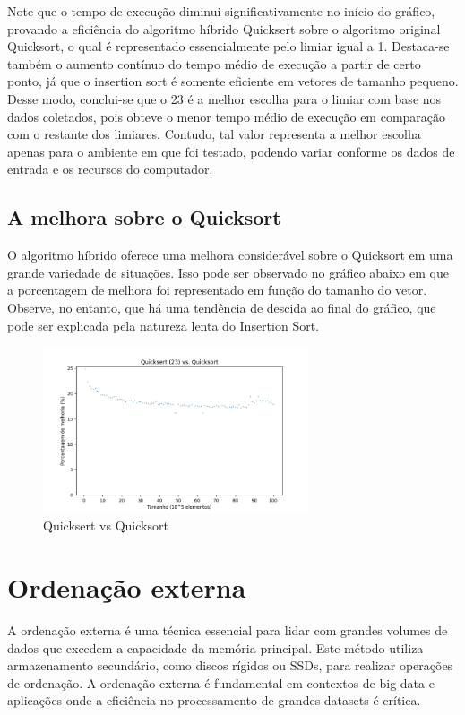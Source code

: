 \documentclass[12pt]{article}
\begin{document}
Note que o tempo de execução diminui significativamente no início do gráfico, provando a eficiência do algoritmo híbrido Quicksert sobre o algoritmo original Quicksort, o qual é representado essencialmente pelo limiar igual a 1. Destaca-se também o aumento contínuo do tempo médio de execução a partir de certo ponto, já que o insertion sort é somente eficiente em vetores de tamanho pequeno. Desse modo, conclui-se que o 23 é a melhor escolha para o limiar com base nos dados coletados, pois obteve o menor tempo médio de execução em comparação com o restante dos limiares. Contudo, tal valor representa a melhor escolha apenas para o ambiente em que foi testado, podendo variar conforme os dados de entrada e os recursos do computador.

\subsection{A melhora sobre o Quicksort}

O algoritmo híbrido oferece uma melhora considerável sobre o Quicksort em uma grande variedade de situações. Isso pode ser observado no gráfico abaixo em que a porcentagem de melhora foi representado em função do tamanho do vetor. Observe, no entanto, que há uma tendência de descida ao final do gráfico, que pode ser explicada pela natureza lenta do Insertion Sort.

\begin{figure}[h]
    \centering
    \includegraphics[width=0.7\textwidth]{quicksert_vs_quicksort.png}
    \caption{Quicksert vs Quicksort}
    \label{fig:exemplo}
\end{figure}


\section{Ordenação externa}

A ordenação externa é uma técnica essencial para lidar com grandes volumes de dados que excedem a capacidade da memória principal. Este método utiliza armazenamento secundário, como discos rígidos ou SSDs, para realizar operações de ordenação. A ordenação externa é fundamental em contextos de big data e aplicações onde a eficiência no processamento de grandes datasets é crítica.
\end{document}

